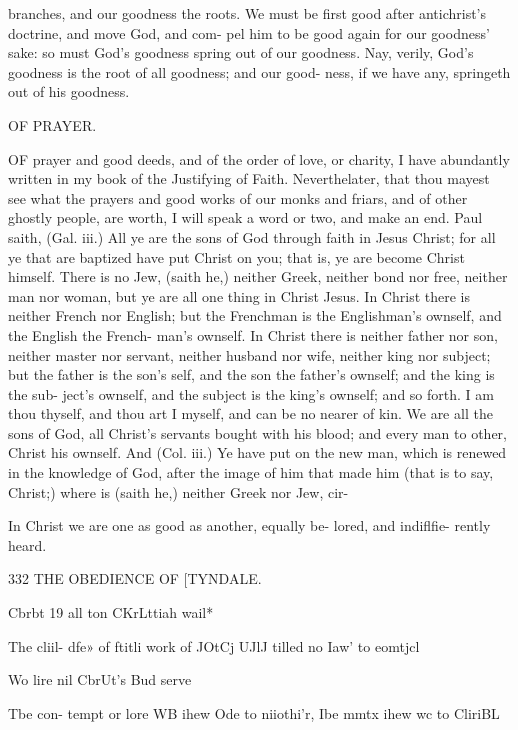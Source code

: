 \documentclass{custom}
\begin{document}
{branches, and our goodness the roots. We must be first 
good after antichrist's doctrine, and move God, and com- 
pel him to be good again for our goodness' sake: so must 
God's goodness spring out of our goodness. Nay, verily, 
God's goodness is the root of all goodness; and our good- 
ness, if we have any, springeth out of his goodness. 


OF PRAYER. 

OF prayer and good deeds, and of the order of love, or 
charity, I have abundantly written in my book of the 
Justifying of Faith. Neverthelater, that thou mayest see 
what the prayers and good works of our monks and friars, 
and of other ghostly people, are worth, I will speak a 
word or two, and make an end. Paul saith, (Gal. iii.) 
All ye are the sons of God through faith in Jesus Christ; 
for all ye that are baptized have put Christ on you; that 
is, ye are become Christ himself. There is no Jew, (saith 
he,) neither Greek, neither bond nor free, neither man nor 
woman, but ye are all one thing in Christ Jesus. In Christ 
there is neither French nor English; but the Frenchman 
is the Englishman's ownself, and the English the French- 
man's ownself. In Christ there is neither father nor son, 
neither master nor servant, neither husband nor wife, 
neither king nor subject; but the father is the son's self, 
and the son the father's ownself; and the king is the sub- 
ject's ownself, and the subject is the king's ownself; and 
so forth. I am thou thyself, and thou art I myself, and can 
be no nearer of kin. We are all the sons of God, all 
Christ's servants bought with his blood; and every man 
to other, Christ his ownself. And (Col. iii.) Ye have put 
on the new man, which is renewed in the knowledge of 
God, after the image of him that made him (that is to say, 
Christ;) where is (saith he,) neither Greek nor Jew, cir- 

In Christ 
we are one 
as good as 
another, 
equally be- 
lored, and 
indiflfie- 
rently 
heard. 


332
THE OBEDIENCE OF
[TYNDALE.

Cbrbt 19 
all ton 
CKrLttiah 
wail* 

The cliil- 
dfe» of 
ftitli work 
of JOtCj UJlJ 
tilled no 
Iaw' to 
eomtjcl 

Wo lire nil 
CbrUt's 
Bud serve 

Tbe con- 
tempt or 
lore WB 
ihew Ode 
to niiothi'r, 
Ibe mmtx 
ihew wc to 
CliriBL 

}
\end{document}
